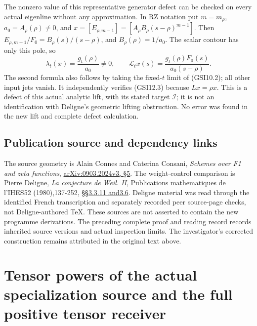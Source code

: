 The nonzero value of this representative generator defect can be checked
on every actual eigenline without any approximation. In RZ notation put
\(m=m_\rho\), \(a_0=A_\rho(\rho)\ne0\), and
\(x=[E_{\rho,m-1}]=[A_\rho B_\rho(s-\rho)^{m-1}]\). Then
\(E_{\rho,m-1}/F_0=B_\rho(s)/(s-\rho)\), and \(B_\rho(\rho)=1/a_0\). The
scalar contour has only this pole, so \[
\lambda_t(x)=\frac{g_t(\rho)}{a_0}\ne0,
\qquad
\mathcal L_tx(s)=\frac{g_t(\rho)F_0(s)}{a_0(s-\rho)}.
\tag{GSI12.5}
\] The second formula also follows by taking the fixed-\(t\) limit of
(GSI10.2); all other input jets vanish. It independently verifies
(GSI12.3) because \(Lx=\rho x\). This is a defect of this actual
analytic lift, with its stated target \(\mathcal I\); it is not an
identification with Deligne's geometric lifting obstruction. No error
was found in the new lift and complete defect calculation.

\section{Publication source and dependency
links}\label{publication-source-and-dependency-links-9}

The source geometry is Alain Connes and Caterina Consani, \emph{Schemes
over F1 and zeta functions},
\href{https://arxiv.org/abs/0903.2024v3}{arXiv:0903.2024v3, §5}. The
weight-control comparison is Pierre Deligne, \emph{La conjecture de
Weil. II}, Publications mathematiques de l'IHES52 (1980),137-252,
\href{https://www.numdam.org/item/PMIHES_1980__52__137_0/}{§§3.3.11
and3.6}. Deligne material was read through the identified French
transcription and separately recorded peer source-page checks, not
Deligne-authored TeX. These sources are not asserted to contain the new
programme derivations. The
\href{https://github.com/KokunoYumeto/zeta-function-research-reader/blob/36a82ecca98addb8a98b48204e349737856c7223/workbenches/splitzero-tandem/continuations/20260924-cohomology-weight-and-character-lifts/BUILD_AND_REVIEW.md}{preceding
complete proof and reading record} records inherited source versions and
actual inspection limits. The investigator's corrected construction
remains attributed in the original text above.

\chapter{Tensor powers of the actual specialization source and the full
positive tensor
receiver}\label{tensor-powers-of-the-actual-specialization-source-and-the-full-positive-tensor-receiver}

